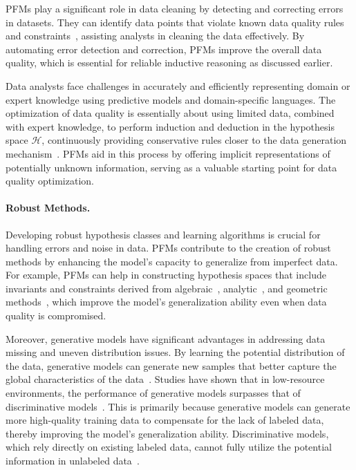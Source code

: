   PFMs play a significant role in data cleaning by detecting and correcting errors in datasets. They can identify data points that violate known data quality rules and constraints~\cite{li2024towards}, assisting analysts in cleaning the data effectively. By automating error detection and correction, PFMs improve the overall data quality, which is essential for reliable inductive reasoning as discussed earlier.
  
  Data analysts face challenges in accurately and efficiently representing domain or expert knowledge using predictive models and domain-specific languages. The optimization of data quality is essentially about using limited data, combined with expert knowledge, to perform induction and deduction in the hypothesis space $\mathcal{H}$, continuously providing conservative rules closer to the data generation mechanism~\cite{peng2022self}. PFMs aid in this process by offering implicit representations of potentially unknown information, serving as a valuable starting point for data quality optimization.
  
  \paragraph{Robust Methods.}
  
  Developing robust hypothesis classes and learning algorithms is crucial for handling errors and noise in data. PFMs contribute to the creation of robust methods by enhancing the model's capacity to generalize from imperfect data. For example, PFMs can help in constructing hypothesis spaces that include invariants and constraints derived from algebraic~\cite{Miao2022LearningIA}, analytic~\cite{Neu2022GeneralizationBV}, and geometric methods~\cite{Atzeni2023InfusingLS}, which improve the model's generalization ability even when data quality is compromised.
  
  Moreover, generative models have significant advantages in addressing data missing and uneven distribution issues. By learning the potential distribution of the data, generative models can generate new samples that better capture the global characteristics of the data~\cite{094dai2017good}. Studies have shown that in low-resource environments, the performance of generative models surpasses that of discriminative models~\cite{097yoon2017semi}. This is primarily because generative models can generate more high-quality training data to compensate for the lack of labeled data, thereby improving the model's generalization ability. Discriminative models, which rely directly on existing labeled data, cannot fully utilize the potential information in unlabeled data~\cite{102yang2018deep}.
  
